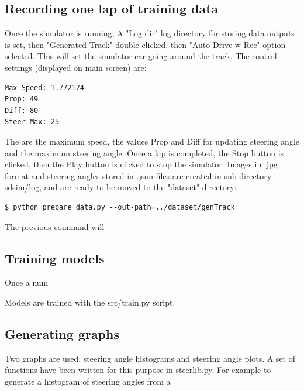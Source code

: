 \subsection{Recording one lap of training data}
\label{recording-one-lap}
Once the simulator is running, A "Log dir" log directory for storing data outputs is set, then "Generated Track" double-clicked, then "Auto Drive w Rec" option selected. This will set the simulator car going around the track. 
The control settings (displayed on main screen) are:
\begin{verbatim}
Max Speed: 1.772174
Prop: 49
Diff: 80
Steer Max: 25
\end{verbatim}
The are the maximum speed, the values Prop and Diff for updating steering angle and the maximum steering angle. Once a lap is completed, the Stop button is clicked, then the Play button is clicked to stop the simulator.  
Images in .jpg format and steering angles stored in .json files are created in sub-directory sdsim/log, and are ready to be moved to the "dataset" directory:
\begin{verbatim}
$ python prepare_data.py --out-path=../dataset/genTrack
\end{verbatim}
The previous command will 

\subsection{Training models}
Once a num

Models are trained with the src/train.py script.

\subsection{Generating graphs}

Two graphs are used, steering angle histograms and steering angle plots. A set of functions have been written for this purpose in steerlib.py. For example to generate a histogram of steering angles from a 









